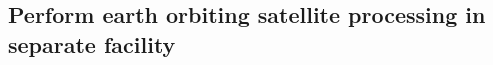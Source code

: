 
\subsection{Perform earth orbiting satellite processing in separate facility} \label{sec:5perform}
